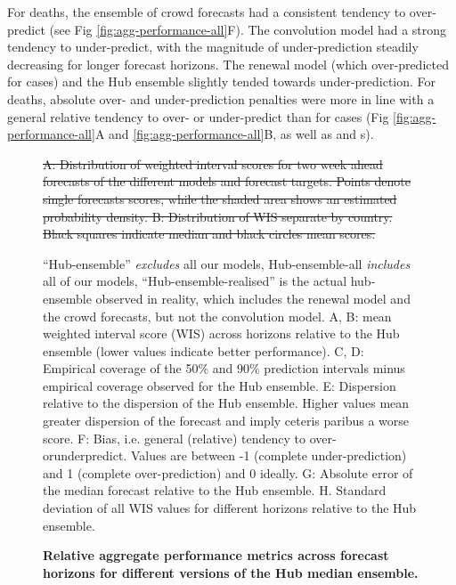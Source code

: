 \documentclass[10pt,letterpaper]{article}
\providecommand{\DIFdeltex}[1]{{\protect\color{red}\sout{#1}}}                      %
\providecommand{\DIFdelFL}[1]{\DIFdel{#1}} %
\providecommand{\DIFdelbeginFL}{} %
\providecommand{\DIFdelendFL}{} %
\providecommand{\DIFdel}[1]{\texorpdfstring{\DIFdeltex{#1}}{}} %
\newcommand{\DIFscaledelfig}{0.5}
\newlength{\DIFdelgraphicswidth} %
\newlength{\DIFdelgraphicsheight} %
\newcommand{\DIFdelincludegraphics}[2][]{%
\sbox{\DIFdelgraphicsbox}{\DIFOincludegraphics[#1]{#2}}%
\settoboxwidth{\DIFdelgraphicswidth}{\DIFdelgraphicsbox} %
\settoboxtotalheight{\DIFdelgraphicsheight}{\DIFdelgraphicsbox} %
\scalebox{\DIFscaledelfig}{%
\parbox[b]{\DIFdelgraphicswidth}{\usebox{\DIFdelgraphicsbox}\\[-\baselineskip] \rule{\DIFdelgraphicswidth}{0em}}\llap{\resizebox{\DIFdelgraphicswidth}{\DIFdelgraphicsheight}{%
\setlength{\unitlength}{\DIFdelgraphicswidth}%
\begin{picture}(1,1)%
\thicklines\linethickness{2pt} %
{\color[rgb]{1,0,0}\put(0,0){\framebox(1,1){}}}%
{\color[rgb]{1,0,0}\put(0,0){\line( 1,1){1}}}%
{\color[rgb]{1,0,0}\put(0,1){\line(1,-1){1}}}%
\end{picture}%
}\hspace*{3pt}}} %
} %
\DeclareRobustCommand{\DIFdelbeginFL}{\DIFOdelbeginFL \let\includegraphics\DIFdelincludegraphics} %
\DeclareRobustCommand{\DIFdelendFL}{\DIFOaddendFL \let\includegraphics\DIFOincludegraphics} %
\begin{document}
For deaths, the ensemble of crowd forecasts had a consistent tendency to
over-predict (see Fig \ref{fig:agg-performance-all}F). The convolution
model had a strong tendency to under-predict, with the magnitude of
under-prediction steadily decreasing for longer forecast horizons. The
renewal model (which over-predicted for cases) and the Hub ensemble
slightly tended towards under-prediction. For deaths, absolute over- and
under-prediction penalties were more in line with a general relative
tendency to over- or under-predict than for cases (Fig
\ref{fig:agg-performance-all}A and \ref{fig:agg-performance-all}B, as
well as  and s).

\begin{figure}[H]
\DIFdelbeginFL %
{%
}
\DIFdelFL{A: Distribution of weighted interval scores for two week ahead forecasts of the different models and forecast targets. Points denote single forecasts scores, while the shaded area shows an estimated probability density. B: Distribution of WIS separate by country. Black squares indicate median and black circles mean scores.
}%

\DIFdelendFL \caption{\bf{Relative aggregate performance metrics across forecast horizons for different versions of the Hub median ensemble.}}
“Hub-ensemble” \textit{excludes} all our models, Hub-ensemble-all \textit{includes} all of our models, “Hub-ensemble-realised” is the actual hub-ensemble observed in reality, which includes the renewal model and the crowd forecasts, but not the convolution model. A, B: mean weighted interval score (WIS) across horizons relative to the Hub ensemble (lower values indicate better performance). C, D: Empirical coverage of the 50\% and 90\% prediction intervals minus empirical coverage observed for the Hub ensemble. E: Dispersion relative to the dispersion of the Hub ensemble. Higher values mean greater dispersion of the forecast and imply ceteris paribus a worse score. F: Bias, i.e. general (relative) tendency to over- orunderpredict. Values are between -1 (complete under-prediction) and 1 (complete over-prediction) and 0 ideally. G: Absolute error of the median forecast relative to the Hub ensemble. H. Standard deviation of all WIS values for different horizons relative to the Hub ensemble.
\label{fig:agg-performance-ensemble-rel}
\end{figure}
\end{document}
